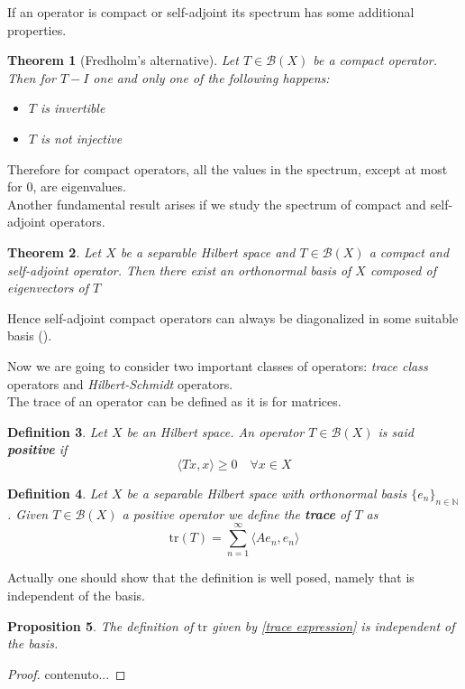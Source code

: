 \documentclass[corpo=11pt, stile=classica, tipotesi=custom,
greek, evenboxes, english]{toptesi}
\numberwithin{equation}{chapter}
\newtheorem{teo}{Theorem}[chapter] %
\newtheorem{defi}[teo]{Definition}
\newtheorem{prop}[teo]{Proposition}
\newcommand{\N}{\mathbb{N}} %
\newcommand{\B}{\mathcal{B}} %
\begin{document}
If an operator is compact or self-adjoint its spectrum has some additional properties.
\begin{teo}[Fredholm's alternative]\label{Fredholm alternative}
	Let $T \in \B(X)$ be a compact operator. Then for $T-I$ one and only one of the following happens:
	\begin{itemize}
		\item $T$ is invertible
		\item $T$ is not injective
	\end{itemize}
\end{teo}
Therefore for compact operators, all the values in the spectrum, except at most for 0, are eigenvalues.\\
Another fundamental result arises if we study the spectrum of compact and self-adjoint operators.
\begin{teo}\label{self-adjoint compact operators are diagonalizable}
	Let $X$ be a separable Hilbert space and $T \in \B(X)$ a compact and self-adjoint operator. Then there exist an orthonormal basis of $X$ composed of eigenvectors of $T$
\end{teo}
Hence self-adjoint compact operators can always be diagonalized in some suitable basis (\cite{brezis}).

Now we are going to consider two important classes of operators: \emph{trace class} operators and \emph{Hilbert-Schmidt} operators.\\
The trace of an operator can be defined as it is for matrices.
\begin{defi}\label{positive operator}
	Let $X$ be an Hilbert space. An operator $T \in \B(X)$ is said \textbf{positive} if
	\begin{equation*}
		\langle T x, x \rangle \geq 0 \quad \forall x \in X
	\end{equation*}
\end{defi}
\begin{defi}\label{trace def}
	Let $X$ be a separable Hilbert space with orthonormal basis $\{e_n\}_{n \in \N}$. Given $T \in \B(X)$ a positive operator we define the \textbf{trace} of $T$ as
	\begin{equation*}\label{trace expression}
		\mathrm{tr}(T) = \sum_{n=1}^{\infty} \langle A e_n, e_n \rangle
	\end{equation*}
\end{defi}
Actually one should show that the definition is well posed, namely that is independent of the basis.
\begin{prop}\label{trace is well-deefined}
	The definition of $\mathrm{tr}$ given by \eqref{trace expression} is independent of the basis.
\end{prop}
\begin{proof}
	contenuto...
\end{proof}
\end{document}
